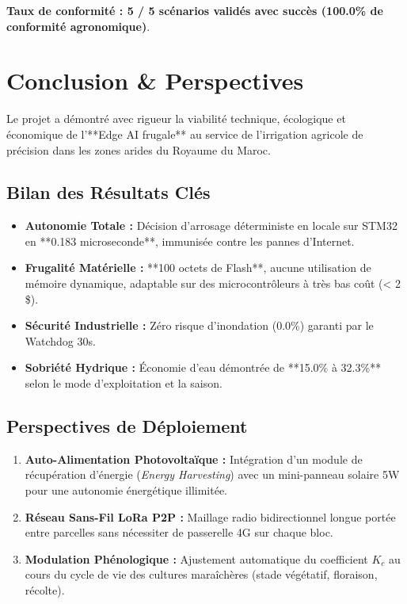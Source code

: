 \documentclass[11pt,a4paper]{report}
\begin{document}
\textbf{Taux de conformité : 5 / 5 scénarios validés avec succès (100.0\% de conformité agronomique)}.

\chapter{Conclusion \& Perspectives}

Le projet a démontré avec rigueur la viabilité technique, écologique et économique de l'**Edge AI frugale** au service de l'irrigation agricole de précision dans les zones arides du Royaume du Maroc.

\section{Bilan des Résultats Clés}
\begin{itemize}
    \item \textbf{Autonomie Totale :} Décision d'arrosage déterministe en locale sur STM32 en **0.183 microseconde**, immunisée contre les pannes d'Internet.
    \item \textbf{Frugalité Matérielle :} **100 octets de Flash**, aucune utilisation de mémoire dynamique, adaptable sur des microcontrôleurs à très bas coût (< 2 \$).
    \item \textbf{Sécurité Industrielle :} Zéro risque d'inondation (0.0\%) garanti par le Watchdog 30s.
    \item \textbf{Sobriété Hydrique :} Économie d'eau démontrée de **15.0\% à 32.3\%** selon le mode d'exploitation et la saison.
\end{itemize}

\section{Perspectives de Déploiement}
\begin{enumerate}
    \item \textbf{Auto-Alimentation Photovoltaïque :} Intégration d'un module de récupération d'énergie (\textit{Energy Harvesting}) avec un mini-panneau solaire 5W pour une autonomie énergétique illimitée.
    \item \textbf{Réseau Sans-Fil LoRa P2P :} Maillage radio bidirectionnel longue portée entre parcelles sans nécessiter de passerelle 4G sur chaque bloc.
    \item \textbf{Modulation Phénologique :} Ajustement automatique du coefficient $K_c$ au cours du cycle de vie des cultures maraîchères (stade végétatif, floraison, récolte).
\end{enumerate}
\end{document}
